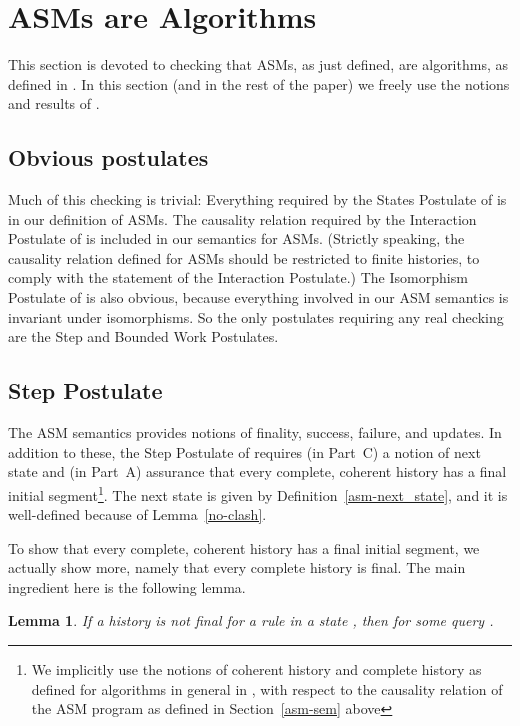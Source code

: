 \documentclass{LMCS}
\newtheorem{la}[thm]{Lemma}
\theoremstyle{definition}
\begin{document}
\section{ASMs are Algorithms} \label{sec:asms-are-algos}

This section is devoted to checking that ASMs, as just defined, are
algorithms, as defined in \cite{ga1}. In this section (and in the
rest of the paper) we freely use the notions and results of
\cite{ga1}.

\subsection{Obvious postulates}

Much of this checking is trivial: Everything required by the States
Postulate of \cite{ga1} is in our definition of ASMs.  The causality
relation required by the Interaction Postulate of \cite{ga1} is
included in our semantics for ASMs. (Strictly speaking, the
causality relation defined for ASMs should be restricted to finite
histories, to comply with the statement of the Interaction
Postulate.)  The Isomorphism Postulate of \cite{ga1} is also
obvious, because everything involved in our ASM semantics is
invariant under isomorphisms.  So the only postulates requiring any
real checking are the Step and Bounded Work Postulates.

\subsection{Step Postulate}

The ASM semantics provides notions of finality, success, failure, and
updates.  In addition to these, the Step Postulate of \cite{ga1}
requires (in Part~C) a notion of next state and (in Part~A) assurance
that every complete, coherent history has a final initial
segment\footnote{We implicitly use the notions of coherent history and
  complete history as defined for algorithms in general in
  \cite[Section~3]{ga1}, with respect to the causality relation of the
  ASM program as defined in Section~\ref{asm-sem} above}.  The next
state is given by Definition~\ref{asm-next_state}, and it is
well-defined because of Lemma~\ref{no-clash}.

To show that every complete, coherent history has a final initial
segment, we actually show more, namely that every complete history is
final.  The main ingredient here is the following lemma.

\begin{la}
  If a history  is not final for a rule  in a state , then
   for some query .
\end{la}
\end{document}
